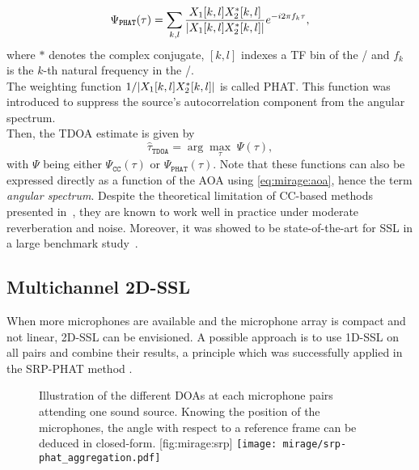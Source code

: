 \begin{equation}\label{eq:mirage:gccphat}
    \Psi_\mathtt{PHAT}(\tau) = \sum_{k,l}\frac{\MIC_1[k,l] \MIC_2^{*}[k,l]}{\kvbar{ \MIC_1[k,l] \MIC_2^{*}[k,l] }} \cste^{-\csti 2  \pi f_k \tau}
    ,
\end{equation}
where $*$ denotes the complex conjugate, $[k,l]$ indexes a \ac{TF} bin of the \STFT/ and $f_k$ is the $k$-th natural frequency in the \STFT/.
\\The weighting function $1 / \kvbar{ \MIC_1[k,l] \MIC_2^{*}[k,l]}$ is called \acf{PHAT}.
This function was introduced to suppress the source's autocorrelation component from the angular spectrum.
\\Then, the \ac{TDOA} estimate is given by
\begin{equation*}
    \hat{\tau}_\mathtt{TDOA} = \arg \underset{\tau}{\max} \; \Psi(\tau)
    ,
\end{equation*}
with $\Psi$ being either $\Psi_\mathtt{CC}(\tau)$ or $\Psi_\mathtt{PHAT}(\tau)$.
Note that these functions can also be expressed directly as a function of the \ac{AOA} using \eqref{eq:mirage:aoa}, hence the term \textit{angular spectrum}.
Despite the theoretical limitation of \ac{CC}-based methods presented in~, they are known to work well in practice under moderate reverberation and noise.
Moreover, it was showed to be state-of-the-art for \ac{SSL} in a large benchmark study~.

\subsection{Multichannel 2D-SSL}\label{subsec:mirage:2D-SSL}
When more microphones are available and the microphone array is compact and not linear, 2D-\ac{SSL} can be envisioned.
A possible approach is to use 1D-\ac{SSL} on all pairs and combine their results, a principle which was successfully applied in the \acf{SRP-PHAT} method .

\begin{figure}
    \begin{sidecaption}[t]{
        Illustration of the different \acp{DOA} at each microphone pairs attending one sound source.
        Knowing the position of the microphones, the angle with respect to a reference frame can be deduced in closed-form.
    }[fig:mirage:srp]
    \texttt{[image: mirage/srp-phat\_aggregation.pdf]}
\end{sidecaption}
\end{figure}

